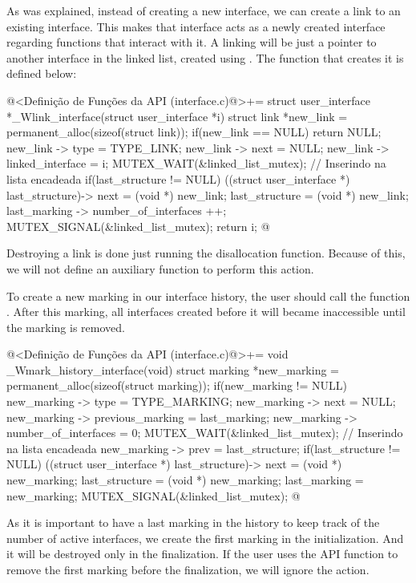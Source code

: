 As was explained, instead of creating a new interface, we can create a
link to an existing interface. This makes that interface acts as a
newly created interface regarding functions that interact with it. A
linking will be just a pointer to another interface in the linked
list, created using . The function that
creates it is defined below:

\iniciocodigo
@<Definição de Funções da API (interface.c)@>+=
struct user_interface *_Wlink_interface(struct user_interface *i){
  struct link *new_link = permanent_alloc(sizeof(struct link));
  if(new_link == NULL)
    return NULL;
  new_link -> type = TYPE_LINK;
  new_link -> next = NULL;
  new_link -> linked_interface = i;
  MUTEX_WAIT(&linked_list_mutex); // Inserindo na lista encadeada
  if(last_structure != NULL)
    ((struct user_interface *) last_structure)-> next = (void *) new_link;
  last_structure = (void *) new_link;
  last_marking -> number_of_interfaces ++;
  MUTEX_SIGNAL(&linked_list_mutex);
  return i;
}
@
\fimcodigo

Destroying a link is done just running the disallocation
function. Because of this, we will not define an auxiliary function to
perform this action.


To create a new marking in our interface history, the user should call
the function . After this
marking, all interfaces created before it will became inaccessible
until the marking is removed.

\iniciocodigo
@<Definição de Funções da API (interface.c)@>+=
void _Wmark_history_interface(void){
  struct marking *new_marking = permanent_alloc(sizeof(struct marking));
  if(new_marking != NULL){
    new_marking -> type = TYPE_MARKING;
    new_marking -> next = NULL;
    new_marking -> previous_marking = last_marking;
    new_marking -> number_of_interfaces = 0;
    MUTEX_WAIT(&linked_list_mutex); // Inserindo na lista encadeada
    new_marking -> prev = last_structure;
    if(last_structure != NULL)
      ((struct user_interface *) last_structure)-> next = (void *) new_marking;
    last_structure = (void *) new_marking;
    last_marking = new_marking;
    MUTEX_SIGNAL(&linked_list_mutex);
  }
}
@
\fimcodigo

As it is important to have a last marking in the history to keep track
of the number of active interfaces, we create the first marking in the
initialization. And it will be destroyed only in the finalization. If
the user uses the API function to remove the first marking before the
finalization, we will ignore the action.

